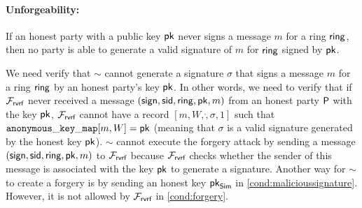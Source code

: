 \paragraph{Unforgeability:}  If an honest party with a public key $ \mathsf{pk} $ never signs a message $ m $ for a ring $ \mathsf{ring} $, then no party is able to generate a valid signature of $ m $ for $ \mathsf{ring} $ signed by $ \mathsf{pk} $. 

We need verify that $ \sim $ cannot generate a signature $ \sigma $ that signs a message $ m $ for a ring $ \mathsf{ring} $ by an honest party's key $ \mathsf{pk} $. In other words, we need to verify that if $ \mathcal{F}_{\textsf{rvrf}} $ never received a message $ (\mathsf{sign}, \textsf{sid},\mathsf{ring},\mathsf{pk},m) $ from an honest party $ \mathsf{P} $ with the key $ \mathsf{pk} $, $ \mathcal{F}_{\textsf{rvrf}} $ cannot have a record $ [m, W, \ring, \sigma, 1] $ such that $ \mathtt{anonymous\_key\_map}[m,W]  = \mathsf{pk}$ (meaning that $ \sigma $ is a valid signature generated by the honest key $ \mathsf{pk} $). 
$ \sim $ cannot execute the forgery attack by sending a message $ (\mathsf{sign}, \textsf{sid},\mathsf{ring},\mathsf{pk},m) $ to $ \mathcal{F}_{\textsf{rvrf}} $ because $ \mathcal{F}_{\textsf{rvrf}} $ checks whether the sender of this message is associated with the key $ \mathsf{pk} $ to generate a signature. Another way for $ \sim $ to create a forgery is by sending an honest key $ \mathsf{pk}_{\mathsf{Sim}} $  in \ref{cond:malicioussignature}. However, it is not allowed by $ \mathcal{F}_{\textsf{rvrf}} $ in \ref{cond:forgery}.


%

